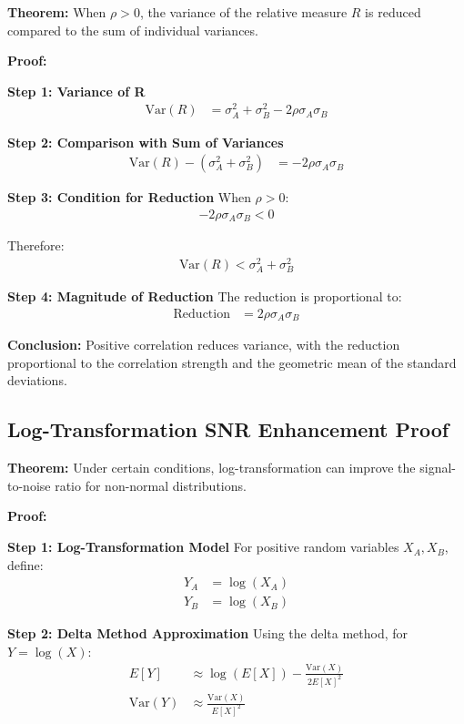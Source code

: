 \textbf{Theorem:} When $\rho > 0$, the variance of the relative measure $R$ is reduced compared to the sum of individual variances.

\textbf{Proof:}

\textbf{Step 1: Variance of R}
\begin{align}
\text{Var}(R) &= \sigma_A^2 + \sigma_B^2 - 2\rho\sigma_A\sigma_B
\end{align}

\textbf{Step 2: Comparison with Sum of Variances}
\begin{align}
\text{Var}(R) - (\sigma_A^2 + \sigma_B^2) &= -2\rho\sigma_A\sigma_B
\end{align}

\textbf{Step 3: Condition for Reduction}
When $\rho > 0$:
\begin{align}
-2\rho\sigma_A\sigma_B < 0
\end{align}

Therefore:
\begin{align}
\text{Var}(R) < \sigma_A^2 + \sigma_B^2
\end{align}

\textbf{Step 4: Magnitude of Reduction}
The reduction is proportional to:
\begin{align}
\text{Reduction} &= 2\rho\sigma_A\sigma_B
\end{align}

\textbf{Conclusion:} Positive correlation reduces variance, with the reduction proportional to the correlation strength and the geometric mean of the standard deviations.

\subsection{Log-Transformation SNR Enhancement Proof}

\textbf{Theorem:} Under certain conditions, log-transformation can improve the signal-to-noise ratio for non-normal distributions.

\textbf{Proof:}

\textbf{Step 1: Log-Transformation Model}
For positive random variables $X_A, X_B$, define:
\begin{align}
Y_A &= \log(X_A) \\
Y_B &= \log(X_B)
\end{align}

\textbf{Step 2: Delta Method Approximation}
Using the delta method, for $Y = \log(X)$:
\begin{align}
E[Y] &\approx \log(E[X]) - \frac{\text{Var}(X)}{2E[X]^2} \\
\text{Var}(Y) &\approx \frac{\text{Var}(X)}{E[X]^2}
\end{align}

